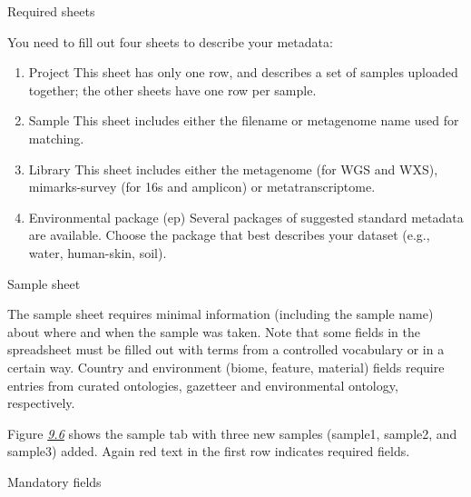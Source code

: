 \documentclass[letterpaper,10pt,english]{sphinxmanual}
\begin{document}
Required sheets

You need to fill out four sheets to describe your metadata:
\begin{enumerate}
\def\theenumi{\arabic{enumi}}
\def\labelenumi{\theenumi .}
\makeatletter\def\p@enumii{\p@enumi \theenumi .}\makeatother
\item {} 
Project \textendash{} This sheet has only one row, and describes a set of samples
uploaded together; the other sheets have one row per sample.

\item {} 
Sample \textendash{} This sheet includes either the filename or metagenome name
used for matching.

\item {} 
Library \textendash{} This sheet includes either the metagenome (for WGS and
WXS), mimarks-survey (for 16s and amplicon) or metatranscriptome.

\item {} 
Environmental package (ep) \textendash{} Several packages of suggested standard
metadata are available. Choose the package that best describes your
dataset (e.g., water, human-skin, soil).

\end{enumerate}

Sample sheet

The sample sheet requires minimal information (including the sample
name) about where and when the sample was taken. Note that some fields
in the spreadsheet must be filled out with terms from a controlled
vocabulary or in a certain way. Country and environment (biome, feature,
material) fields require entries from curated ontologies, gazetteer and
environmental ontology, respectively.

Figure {\hyperref[\detokenize{user_manual:fig:project-spreadsheet-with-3-samples}]{\emph{9.6}}} shows the
sample tab with three new samples (sample1, sample2, and sample3) added.
Again red text in the first row indicates required fields.

Mandatory fields
\end{document}
